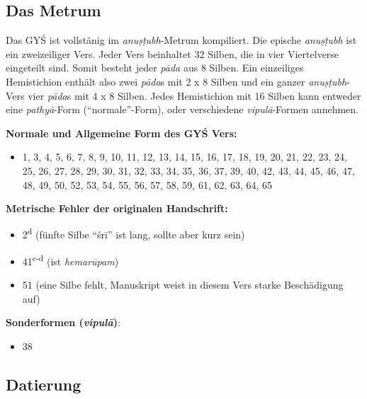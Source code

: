 \documentclass[a4paper,12pt]{article}
\begin{document}
{\subsection{Das Metrum}

Das GYŚ ist vollstänig im \textit{anuṣṭubh}-Metrum kompiliert. Die epische \textit{anuṣṭubh} ist ein zweizeiliger Vers. Jeder Vers beinhaltet 32 Silben, die in vier Viertelverse eingeteilt sind. Somit besteht jeder \textit{pāda} aus 8 Silben. Ein einzeiliges Hemistichion enthält also zwei \textit{pāda}s mit 2 x 8 Silben und ein ganzer \textit{anuṣṭubh}-Vers vier \textit{pāda}s mit 4 x 8 Silben. Jedes Hemistichion mit 16 Silben kann entweder eine \textit{pathyā}-Form (``normale''-Form), oder verschiedene \textit{vipulā}-Formen annehmen.

\textbf{Normale und Allgemeine Form des GYŚ Vers:}
\begin{itemize}
 \item{1, 3, 4, 5, 6, 7, 8, 9, 10, 11, 12, 13, 14, 15, 16, 17, 18, 19, 20, 21, 22, 23, 24, 25, 26, 27, 28, 29, 30, 31, 32, 33, 34, 35, 36, 37, 39, 40, 42, 43, 44, 45, 46, 47, 48, 49, 50, 52, 53, 54, 55, 56, 57, 58, 59, 61, 62, 63, 64, 65}
  \end{itemize}

\textbf{Metrische Fehler der originalen Handschrift:}
\begin{itemize}
\item{2\textsuperscript{d} (fünfte Silbe ``śrī'' ist lang, sollte aber kurz sein)}
\item{41\textsuperscript{c-d} (ist \textit{hemarūpam})}
\item{51 (eine Silbe fehlt, Manuskript weist in diesem Vers starke Beschädigung auf)}
\end{itemize}

\textbf{Sonderformen (\textit{vipulā})}:
\begin{itemize}
\item{38}
\end{itemize}


\subsection{Datierung}
\label{datierung}

}
\end{document}
